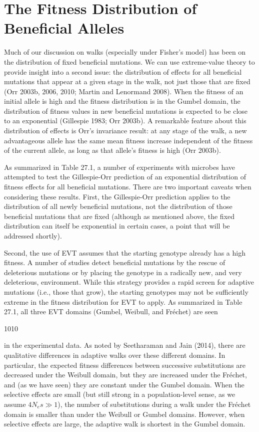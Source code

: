 \documentclass{article}
\begin{document}
\section{The Fitness Distribution of Beneficial Alleles}
Much of our discussion on walks (especially under Fisher's model) has been on the distribution of fixed beneficial mutations. We can use extreme-value theory to provide insight into a second issue: the distribution of effects for all beneficial mutations that appear at a given stage in the walk, not just those that are fixed (Orr 2003b, 2006, 2010; Martin and Lenormand 2008). When the fitness of an initial allele is high and the fitness distribution is in the Gumbel domain, the distribution of fitness values in new beneficial mutations is expected to be close to an exponential (Gillespie 1983; Orr 2003b). A remarkable feature about this distribution of effects is Orr's invariance result: at any stage of the walk, a new advantageous allele has the same mean fitness increase independent of the fitness of the current allele, as long as that allele's fitness is high (Orr 2003b).

As summarized in Table 27.1, a number of experiments with microbes have attempted to test the Gillespie-Orr prediction of an exponential distribution of fitness effects for all beneficial mutations. There are two important caveats when considering these results. First, the Gillespie-Orr prediction applies to the distribution of all newly beneficial mutations, not the distribution of those beneficial mutations that are fixed (although as mentioned above, the fixed distribution can itself be exponential in certain cases, a point that will be addressed shortly).

Second, the use of EVT assumes that the starting genotype already has a high fitness. A number of studies detect beneficial mutations by the rescue of deleterious mutations or by placing the genotype in a radically new, and very deleterious, environment. While this strategy provides a rapid screen for adaptive mutations (i.e., those that grow), the starting genotypes may not be sufficiently extreme in the fitness distribution for EVT to apply. As summarized in Table 27.1, all three EVT domains (Gumbel, Weibull, and Fréchet) are seen

1010

in the experimental data. As noted by Seetharaman and Jain (2014), there are qualitative differences in adaptive walks over these different domains. In particular, the expected fitness differences between successive substitutions are decreased under the Weibull domain, but they are increased under the Fréchet, and (as we have seen) they are constant under the Gumbel domain. When the selective effects are small (but still strong in a population-level sense, as we assume  $ 4N_{e}s \gg 1 $), the number of substitutions during a walk under the Fréchet domain is smaller than under the Weibull or Gumbel domains. However, when selective effects are large, the adaptive walk is shortest in the Gumbel domain.
\end{document}
